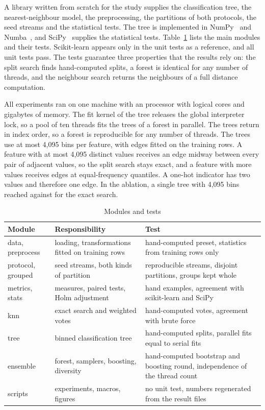 \documentclass[10pt,conference]{IEEEtran}
\begin{document}
A library written from scratch for the study supplies the classification tree, the nearest-neighbour model, the preprocessing, the partitions of both protocols, the seed streams and the statistical tests. The tree is implemented in NumPy~\cite{harris2020a} and Numba~\cite{lam2015a}, and SciPy~\cite{virtanen2020a} supplies the statistical tests. Table~\ref{tab:modules} lists the main modules and their tests. Scikit-learn appears only in the unit tests as a reference, and all unit tests pass. The tests guarantee three properties that the results rely on: the split search finds hand-computed splits, a forest is identical for any number of threads, and the neighbour search returns the neighbours of a full distance computation.

All experiments ran on one machine with an \cpuModel{} processor with \logicalCores{} logical cores and \ramGB{} gigabytes of memory. The fit kernel of the tree releases the global interpreter lock, so a pool of ten threads fits the trees of a forest in parallel. The trees return in index order, so a forest is reproducible for any number of threads. The trees use at most 4,095 bins per feature, with edges fitted on the training rows. A feature with at most 4,095 distinct values receives an edge midway between every pair of adjacent values, so the split search stays exact, and a feature with more values receives edges at equal-frequency quantiles. A one-hot indicator has two values and therefore one edge. In the ablation, a single tree with 4,095 bins reached \AbTreeBinsMidMacroF{} against \AbTreeRawMacroF{} for the exact search.

\begin{table}[b]
\caption{Modules and tests}
\label{tab:modules}
\centering
\footnotesize
\setlength{\tabcolsep}{3pt}
\begin{tabular}{@{}>{\raggedright\arraybackslash}p{}>{\raggedright\arraybackslash}p{}>{\raggedright\arraybackslash}p{}@{}}
\toprule
Module & Responsibility & Test \\
\midrule
data, preprocess & loading, transformations fitted on training rows & hand-computed preset, statistics from training rows only \\
protocol, grouped & seed streams, both kinds of partition & reproducible streams, disjoint partitions, groups kept whole \\
metrics, stats & measures, paired tests, Holm adjustment & hand examples, agreement with scikit-learn and SciPy \\
knn & exact search and weighted votes & hand-computed votes, agreement with brute force \\
tree & binned classification tree & hand-computed splits, parallel fits equal to serial fits \\
ensemble & forest, samplers, boosting, diversity & hand-computed bootstrap and boosting round, independence of the thread count \\
scripts & experiments, macros, figures & no unit test, numbers regenerated from the result files \\
\bottomrule
\end{tabular}
\end{table}
\end{document}
